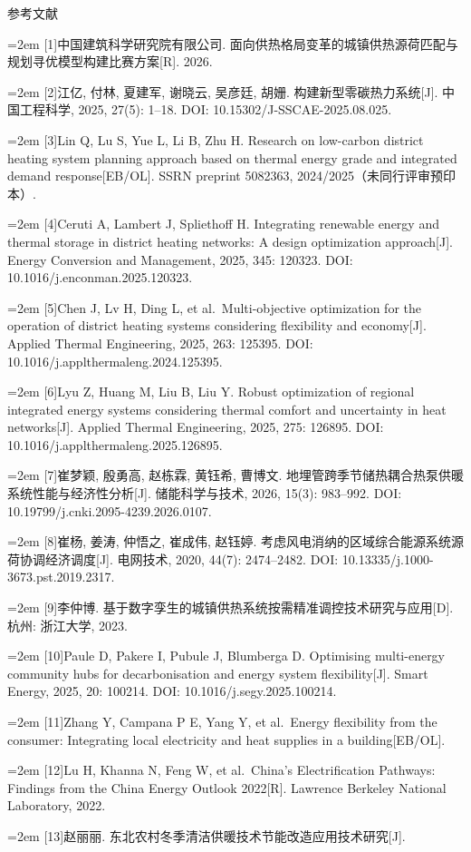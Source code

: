 \documentclass[12pt,a4paper]{article}
\newcommand{\heiti}{\headingfont}
\newcommand{\sihao}{\fontsize{14pt}{14pt}\selectfont}
\newenvironment{refsectionflush}
  {\par\sloppy\setlength{\parindent}{0pt}\setlength{\parskip}{0pt}}
  {\par\fussy}
\newcommand{\refentry}[2]{%
  \par\noindent\hangindent=2em\hangafter=1
  [#1]\enspace #2\par}
\begin{document}
\clearpage
\begin{center}{\heiti\sihao 参考文献}\end{center}
\begin{refsectionflush}
\refentry{1}{中国建筑科学研究院有限公司.
面向供热格局变革的城镇供热源荷匹配与规划寻优模型构建比赛方案{[}R{]}.
2026.}
\refentry{2}{江亿, 付林, 夏建军, 谢晓云, 吴彦廷, 胡姗.
构建新型零碳热力系统{[}J{]}. 中国工程科学, 2025, 27(5): 1--18. DOI:
10.15302/J-SSCAE-2025.08.025.}
\refentry{3}{Lin Q, Lu S, Yue L, Li B, Zhu H. Research on low-carbon district
heating system planning approach based on thermal energy grade and
integrated demand response{[}EB/OL{]}. SSRN preprint 5082363,
2024/2025（未同行评审预印本）.}
\refentry{4}{Ceruti A, Lambert J, Spliethoff H. Integrating renewable energy
and thermal storage in district heating networks: A design optimization
approach{[}J{]}. Energy Conversion and Management, 2025, 345: 120323.
DOI: 10.1016/j.enconman.2025.120323.}
\refentry{5}{Chen J, Lv H, Ding L, et al.~Multi-objective optimization for
the operation of district heating systems considering flexibility and
economy{[}J{]}. Applied Thermal Engineering, 2025, 263: 125395. DOI:
10.1016/j.applthermaleng.2024.125395.}
\refentry{6}{Lyu Z, Huang M, Liu B, Liu Y. Robust optimization of regional
integrated energy systems considering thermal comfort and uncertainty in
heat networks{[}J{]}. Applied Thermal Engineering, 2025, 275: 126895.
DOI: 10.1016/j.applthermaleng.2025.126895.}
\refentry{7}{崔梦颖, 殷勇高, 赵栋霖, 黄钰希, 曹博文.
地埋管跨季节储热耦合热泵供暖系统性能与经济性分析{[}J{]}. 储能科学与技术,
2026, 15(3): 983--992. DOI: 10.19799/j.cnki.2095-4239.2026.0107.}
\refentry{8}{崔杨, 姜涛, 仲悟之, 崔成伟, 赵钰婷.
考虑风电消纳的区域综合能源系统源荷协调经济调度{[}J{]}. 电网技术, 2020,
44(7): 2474--2482. DOI: 10.13335/j.1000-3673.pst.2019.2317.}
\refentry{9}{李仲博.
基于数字孪生的城镇供热系统按需精准调控技术研究与应用{[}D{]}. 杭州:
浙江大学, 2023.}
\refentry{10}{Paule D, Pakere I, Pubule J, Blumberga D. Optimising
multi-energy community hubs for decarbonisation and energy system
flexibility{[}J{]}. Smart Energy, 2025, 20: 100214. DOI:
10.1016/j.segy.2025.100214.}
\refentry{11}{Zhang Y, Campana P E, Yang Y, et al.~Energy flexibility from
the consumer: Integrating local electricity and heat supplies in a
building{[}EB/OL{]}.}
\refentry{12}{Lu H, Khanna N, Feng W, et al.~China's Electrification
Pathways: Findings from the China Energy Outlook 2022{[}R{]}. Lawrence
Berkeley National Laboratory, 2022.}
\refentry{13}{赵丽丽. 东北农村冬季清洁供暖技术节能改造应用技术研究{[}J{]}.
}
\end{refsectionflush}
\end{document}
